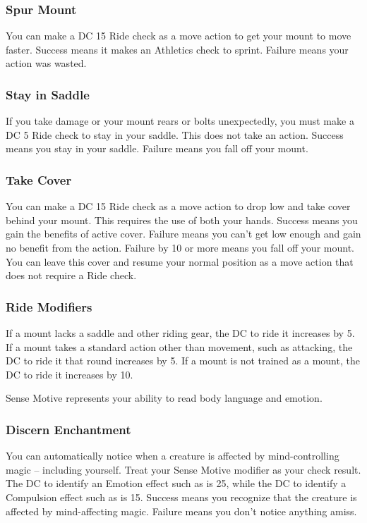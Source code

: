 \subsubsection{Spur Mount}
You can make a DC 15 Ride check as a move action to get your mount to move faster. Success means it makes an Athletics check to sprint. Failure means your action was wasted.

\subsubsection{Stay in Saddle}
If you take damage or your mount rears or bolts unexpectedly, you must make a DC 5 Ride check to stay in your saddle. This does not take an action. Success means you stay in your saddle. Failure means you fall off your mount.

\subsubsection{Take Cover}
You can make a DC 15 Ride check as a move action to drop low and take cover behind your mount. This requires the use of both your hands. Success means you gain the benefits of active cover. Failure means you can't get low enough and gain no benefit from the action. Failure by 10 or more means you fall off your mount. You can leave this cover and resume your normal position as a move action that does not require a Ride check.

\subsubsection{Ride Modifiers}\label{Ride Modifiers}
If a mount lacks a saddle and other riding gear, the DC to ride it increases by 5. If a mount takes a standard action other than movement, such as attacking, the DC to ride it that round increases by 5. If a mount is not trained as a mount, the DC to ride it increases by 10.

Sense Motive represents your ability to read body language and emotion.

\subsubsection{Discern Enchantment}
You can automatically notice when a creature is affected by mind-controlling magic -- including yourself. Treat your Sense Motive modifier as your check result. The DC to identify an Emotion effect such as  is 25, while the DC to identify a Compulsion effect such as  is 15. Success means you recognize that the creature is affected by mind-affecting magic. Failure means you don't notice anything amiss.


